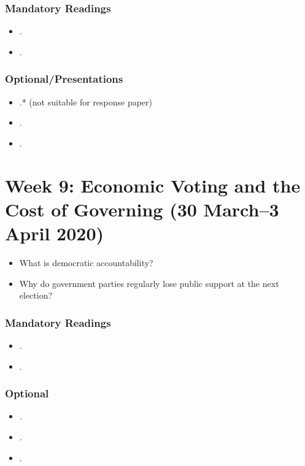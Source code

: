 \documentclass[abstract=on,parskip=full,headings=standardclasses,fontsize=11pt,paper=a4]{scrartcl}
\begin{document}
\subsubsection*{Mandatory Readings}
\begin{itemize}
\item {}.
\item {}.
\end{itemize}

\subsubsection*{Optional/Presentations}
\begin{itemize}
\item {}.* (not suitable for response paper)
\item {}.
\item {}.
\end{itemize}


\section{Week 9: Economic Voting and the Cost of Governing (30 March--3 April 2020)}


\begin{itemize}
\renewcommand\labelitemi{--}
\item What is democratic accountability?
\item Why do government parties  regularly lose public support at the next election?
\end{itemize}

\subsubsection*{Mandatory Readings}

\begin{itemize}
\item {}.
\item {}.
\end{itemize}

\subsubsection*{Optional}
\begin{itemize}
\item {}.
\item {}.
\item {}.
\end{itemize}
\end{document}
